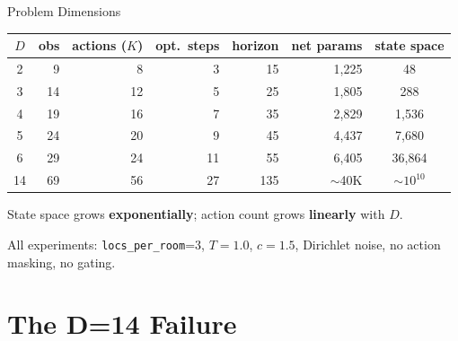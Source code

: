 \documentclass[aspectratio=169, 10pt]{beamer}
\begin{document}
\begin{frame}{Problem Dimensions}

\centering
\begin{tabular}{crrrrrc}
\toprule
$D$ & obs & actions ($K$) & opt.\ steps & horizon & net params & state space \\
\midrule
2 &  9 &  8 &  3 &  15 &  1{,}225 &       48 \\
3 & 14 & 12 &  5 &  25 &  1{,}805 &      288 \\
4 & 19 & 16 &  7 &  35 &  2{,}829 &    1{,}536 \\
5 & 24 & 20 &  9 &  45 &  4{,}437 &    7{,}680 \\
6 & 29 & 24 & 11 &  55 &  6{,}405 &   36{,}864 \\
\midrule
14 & 69 & 56 & 27 & 135 & $\sim$40K & $\sim 10^{10}$ \\
\bottomrule
\end{tabular}

\vspace{0.5cm}
State space grows \textbf{exponentially}; action count grows \textbf{linearly} with $D$.

\vspace{0.2cm}
{\small All experiments: \texttt{locs\_per\_room}=3, $T=1.0$, $c=1.5$, Dirichlet noise, no action masking, no gating.}

\end{frame}

\section{The D=14 Failure}
\end{document}
